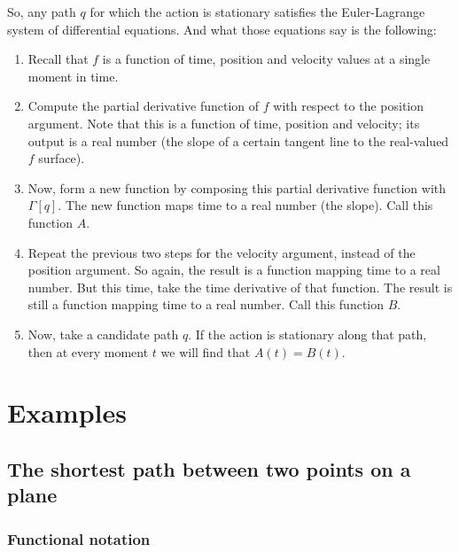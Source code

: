 So, any path $q$ for which the action is stationary satisfies the Euler-Lagrange system of differential
equations. And what those equations say is the following:
\begin{enumerate}
\item Recall that $f$ is a function of time, position and velocity values at a single moment in time.

\item Compute the partial derivative function of $f$ with respect to the position argument. Note that this is a
  function of time, position and velocity; its output is a real number (the slope of a certain tangent line to
  the real-valued $f$ surface).

\item Now, form a new function by composing this partial derivative function with $\Gamma[q]$. The new function
  maps time to a real number (the slope). Call this function $A$.

\item Repeat the previous two steps for the velocity argument, instead of the position argument. So again, the
  result is a function mapping time to a real number. But this time, take the time derivative of that
  function. The result is still a function mapping time to a real number. Call this function $B$.

\item Now, take a candidate path $q$. If the action is stationary along that path, then at every moment $t$ we will
  find that $A(t) = B(t)$.
\end{enumerate}

\section{Examples}
\subsection{The shortest path between two points on a plane}

\subsubsection{Functional notation}

\begin{question*}

\end{question*}

